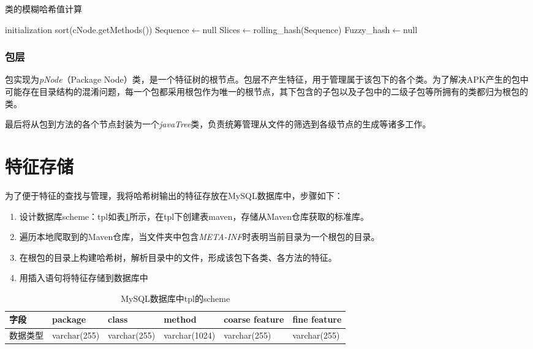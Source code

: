 \begin{algorithm}[htb]
  \caption{类的模糊哈希值计算}
  \label{algo:fuzzyhash}
  \small
  \SetAlgoLined

  initialization\;
  sort(cNode.getMethods())\;
  Sequence$\leftarrow$null\;
  Slices$\leftarrow$rolling\_hash(Sequence)\;
  Fuzzy\_hash$\leftarrow$null\;

\end{algorithm}


\subsubsection{包层}

包实现为\textit{pNode}（Package Node）类，是一个特征树的根节点。包层不产生特征，用于管理属于该包下的各个类。为了解决APK产生的包中可能存在目录结构的混淆问题，每一个包都采用根包作为唯一的根节点，其下包含的子包以及子包中的二级子包等所拥有的类都归为根包的类。

最后将从包到方法的各个节点封装为一个\textit{javaTree}类，负责统筹管理从文件的筛选到各级节点的生成等诸多工作。



\section{特征存储}

为了便于特征的查找与管理，我将哈希树输出的特征存放在MySQL数据库中，步骤如下：

\begin{enumerate}
\item{设计数据库scheme：tpl如表\ref{tab:mysql}所示，在tpl下创建表maven，存储从Maven仓库获取的标准库。}
\item{遍历本地爬取到的Maven仓库，当文件夹中包含\textit{META-INF}时表明当前目录为一个根包的目录。}
\item{在根包的目录上构建哈希树，解析目录中的文件，形成该包下各类、各方法的特征。}
\item{用插入语句将特征存储到数据库中}
\end{enumerate}

\begin{table}[!hpt]
  \caption{MySQL数据库中tpl的scheme}
  \label{tab:mysql}
  \centering
  \begin{tabular}{l|lllll} \toprule
    字段 &  package & class & method & coarse feature & fine feature \\ \midrule
    数据类型 & varchar(255) & varchar(255) & varchar(1024) & varchar(255) & varchar(255)  \\  \bottomrule

  \end{tabular}
\end{table}



